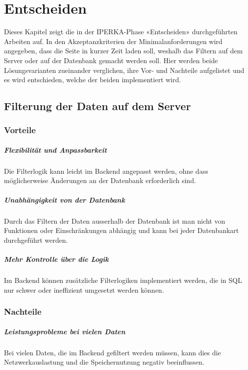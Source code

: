 \chapter{Entscheiden}\label{ch:entscheiden}
Dieses Kapitel zeigt die in der IPERKA-Phase «Entscheiden» durchgeführten Arbeiten auf. In den Akzeptanzkriterien der Minimalanforderungen wird angegeben, dass die Seite in kurzer Zeit laden soll, weshalb das Filtern auf dem Server oder auf der Datenbank gemacht werden soll. Hier werden beide Lösungsvarianten zueinander verglichen, ihre Vor- und Nachteile aufgelistet und es wird entschieden, welche der beiden implementiert wird.

\section{Filterung der Daten auf dem Server}

\subsection{Vorteile}
\paragraph{Flexibilität und Anpassbarkeit} Die Filterlogik kann leicht im Backend angepasst werden, ohne dass möglicherweise Änderungen an der Datenbank erforderlich sind.
\paragraph{Unabhängigkeit von der Datenbank} Durch das Filtern der Daten ausserhalb der Datenbank ist man nicht von Funktionen oder Einschränkungen abhängig und kann bei jeder Datenbankart durchgeführt werden.
\paragraph{Mehr Kontrolle über die Logik} Im Backend können zusätzliche Filterlogiken implementiert werden, die in SQL nur schwer oder ineffizient umgesetzt werden können.

\subsection{Nachteile}
\paragraph{Leistungsprobleme bei vielen Daten} Bei vielen Daten, die im Backend gefiltert werden müssen, kann dies die Netzwerkauslastung und die Speichernutzung negativ beeinflussen.
